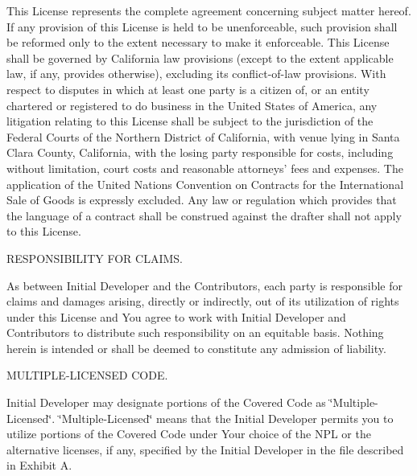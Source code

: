 \begin{DoxyEnumerate}
This License represents the complete agreement concerning subject matter hereof. If any provision of this License is held to be unenforceable, such provision shall be reformed only to the extent necessary to make it enforceable. This License shall be governed by California law provisions (except to the extent applicable law, if any, provides otherwise), excluding its conflict-\/of-\/law provisions. With respect to disputes in which at least one party is a citizen of, or an entity chartered or registered to do business in the United States of America, any litigation relating to this License shall be subject to the jurisdiction of the Federal Courts of the Northern District of California, with venue lying in Santa Clara County, California, with the losing party responsible for costs, including without limitation, court costs and reasonable attorneys' fees and expenses. The application of the United Nations Convention on Contracts for the International Sale of Goods is expressly excluded. Any law or regulation which provides that the language of a contract shall be construed against the drafter shall not apply to this License.
\item R\-E\-S\-P\-O\-N\-S\-I\-B\-I\-L\-I\-T\-Y F\-O\-R C\-L\-A\-I\-M\-S.

As between Initial Developer and the Contributors, each party is responsible for claims and damages arising, directly or indirectly, out of its utilization of rights under this License and You agree to work with Initial Developer and Contributors to distribute such responsibility on an equitable basis. Nothing herein is intended or shall be deemed to constitute any admission of liability.
\item M\-U\-L\-T\-I\-P\-L\-E-\/\-L\-I\-C\-E\-N\-S\-E\-D C\-O\-D\-E.

Initial Developer may designate portions of the Covered Code as \char`\"{}\-Multiple-\/\-Licensed\char`\"{}. \char`\"{}\-Multiple-\/\-Licensed\char`\"{} means that the Initial Developer permits you to utilize portions of the Covered Code under Your choice of the N\-P\-L or the alternative licenses, if any, specified by the Initial Developer in the file described in Exhibit A.
\end{DoxyEnumerate}

